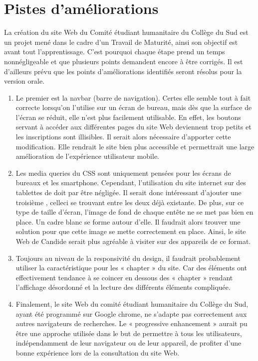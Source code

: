 \documentclass[a4,10pt,french]{sphinxmanual}
\begin{document}
\section{Pistes d’améliorations}
\label{\detokenize{chapitre-03:pistes-dameliorations}}
\sphinxAtStartPar
La création du site Web du Comité étudiant humanitaire du Collège du Sud est un projet mené dans le cadre d’un Travail de Maturité, ainsi son objectif est avant tout l’apprentissage. C’est pourquoi chaque étape prend un temps non\sphinxhyphen{}négligeable et que plusieurs points demandent encore à être corrigés. Il est d’ailleurs prévu que les points d’améliorations identifiés seront résolus pour la version orale.
\begin{enumerate}
%
\item {} 
\sphinxAtStartPar
Le premier est la nav\sphinxhyphen{}bar (barre de navigation). Certes elle semble tout à fait correcte lorsqu’on l’utilise sur un écran de bureau, mais dès que la surface de l’écran se réduit, elle n’est plus facilement utilisable. En effet, les boutons servant à accéder aux différentes pages du site Web deviennent trop petits et les inscriptions sont illisibles. Il serait alors nécessaire d’apporter cette modification. Elle rendrait le site bien plus accessible et permettrait une large amélioration de l’expérience utilisateur mobile.

\item {} 
\sphinxAtStartPar
Les media queries du CSS sont uniquement pensées pour les écrans de bureaux et les smartphone. Cependant, l’utilisation du site internet sur des tablettes de doit par être négligée. Il serait donc intéressant d’ajouter une troisième , celle\sphinxhyphen{}ci se trouvant entre les deux déjà existante. De plus, sur ce type de taille d’écran, l’image de fond de chaque entête ne se met pas bien en place. Un cadre blanc se forme autour d’elle. Il faudrait alors trouver une solution pour que cette image se mette correctement en place. Ainsi, le site Web de Candide serait plus agréable à visiter sur des appareils de ce format.

\item {} 
\sphinxAtStartPar
Toujours au niveau de la responsivité du design, il faudrait probablement utiliser la caractéristique  pour les « chapter » du site. Car des éléments ont effectivement tendance à se coincer en dessous des « chapter » rendant l’affichage désordonné et la lecture des différents éléments compliquée.

\item {} 
\sphinxAtStartPar
Finalement, le site Web du comité étudiant humanitaire du Collège du Sud, ayant été programmé sur Google chrome, ne s’adapte pas correctement aux autres navigateurs de recherches. Le « progressive enhancement » aurait pu être une approche utilisée dans le but de permettre à tous les utilisateurs, indépendamment de leur navigateur ou de leur appareil, de profiter d’une bonne expérience lors de la consultation du site Web.

\end{enumerate}
\end{document}
